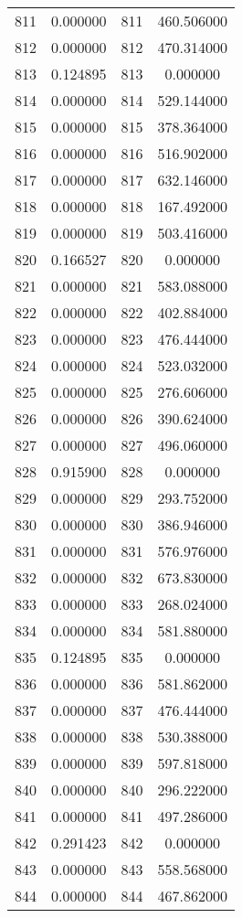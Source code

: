 \documentclass[12pt]{article}
\begin{document}
\begin{longtable}{@{}cccc@{}}
811 & 0.000000 & 811 & 460.506000 \\
812 & 0.000000 & 812 & 470.314000 \\
813 & 0.124895 & 813 & 0.000000 \\
814 & 0.000000 & 814 & 529.144000 \\
815 & 0.000000 & 815 & 378.364000 \\
816 & 0.000000 & 816 & 516.902000 \\
817 & 0.000000 & 817 & 632.146000 \\
818 & 0.000000 & 818 & 167.492000 \\
819 & 0.000000 & 819 & 503.416000 \\
820 & 0.166527 & 820 & 0.000000 \\
821 & 0.000000 & 821 & 583.088000 \\
822 & 0.000000 & 822 & 402.884000 \\
823 & 0.000000 & 823 & 476.444000 \\
824 & 0.000000 & 824 & 523.032000 \\
825 & 0.000000 & 825 & 276.606000 \\
826 & 0.000000 & 826 & 390.624000 \\
827 & 0.000000 & 827 & 496.060000 \\
828 & 0.915900 & 828 & 0.000000 \\
829 & 0.000000 & 829 & 293.752000 \\
830 & 0.000000 & 830 & 386.946000 \\
831 & 0.000000 & 831 & 576.976000 \\
832 & 0.000000 & 832 & 673.830000 \\
833 & 0.000000 & 833 & 268.024000 \\
834 & 0.000000 & 834 & 581.880000 \\
835 & 0.124895 & 835 & 0.000000 \\
836 & 0.000000 & 836 & 581.862000 \\
837 & 0.000000 & 837 & 476.444000 \\
838 & 0.000000 & 838 & 530.388000 \\
839 & 0.000000 & 839 & 597.818000 \\
840 & 0.000000 & 840 & 296.222000 \\
841 & 0.000000 & 841 & 497.286000 \\
842 & 0.291423 & 842 & 0.000000 \\
843 & 0.000000 & 843 & 558.568000 \\
844 & 0.000000 & 844 & 467.862000 \\

\end{longtable}
\end{document}
